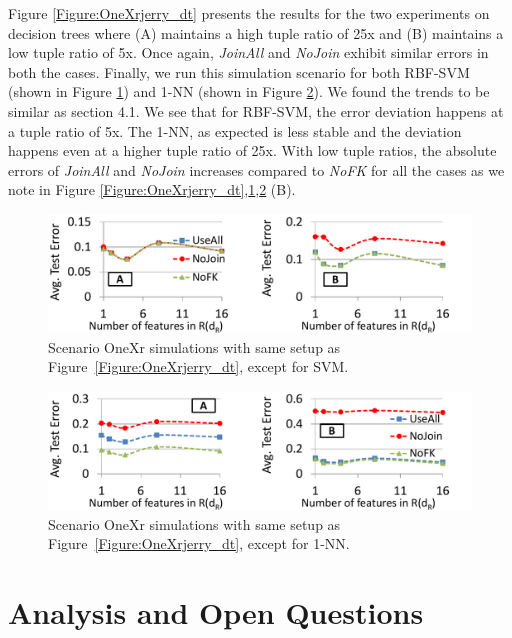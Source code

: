 \documentclass{vldb}
\begin{document}
Figure \ref{Figure:OneXrjerry_dt} presents the results for the two experiments on decision trees where (A) maintains a high tuple ratio of 25x and (B) maintains a low tuple ratio of 5x. Once again, \textit{JoinAll} and \textit{NoJoin} exhibit similar errors in both the cases. Finally, we run this simulation scenario for both RBF-SVM (shown in Figure \ref{Figure:OneXrjerry_svm}) and 1-NN (shown in Figure \ref{Figure:OneXrjerry_1nn}). We found the trends to be similar as section 4.1. We see that for RBF-SVM, the error deviation happens at a tuple ratio of 5x. The 1-NN, as expected is less stable and the deviation happens even at a higher tuple ratio of 25x. With low tuple ratios, the absolute errors of \textit{JoinAll} and \textit{NoJoin} increases compared to \textit{NoFK} for all the cases as we note in Figure \ref{Figure:OneXrjerry_dt},\ref{Figure:OneXrjerry_svm},\ref{Figure:OneXrjerry_1nn} (B).

\begin{figure}[h]
\centering
\includegraphics[width=0.99\linewidth]{onexr_jerrysvm.pdf}
\caption{Scenario OneXr simulations with same setup as Figure~\ref{Figure:OneXrjerry_dt}, except for SVM.}
\label{Figure:OneXrjerry_svm}
\end{figure}

\begin{figure}[h]
\centering
\includegraphics[width=0.99\linewidth]{onexr_jerry1nn.pdf}
\caption{Scenario OneXr simulations with same setup as Figure~\ref{Figure:OneXrjerry_dt}, except for 1-NN.}
\label{Figure:OneXrjerry_1nn}
\end{figure}


\section{Analysis and Open Questions}
\end{document}
